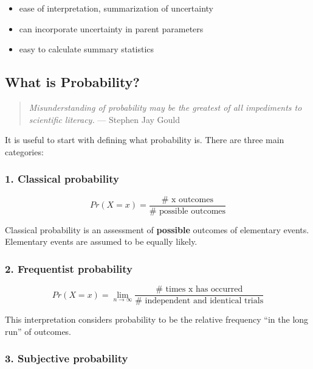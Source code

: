 \documentclass[11pt]{article}
\providecommand{\tightlist}{%
      \setlength{\itemsep}{0pt}\setlength{\parskip}{0pt}}
\begin{document}
\begin{itemize}
\tightlist
\item
  ease of interpretation, summarization of uncertainty
\item
  can incorporate uncertainty in parent parameters
\item
  easy to calculate summary statistics
\end{itemize}

    \hypertarget{what-is-probability}{%
\subsection{What is Probability?}\label{what-is-probability}}

\begin{quote}
\emph{Misunderstanding of probability may be the greatest of all
impediments to scientific literacy.} --- Stephen Jay Gould
\end{quote}

It is useful to start with defining what probability is. There are three
main categories:

\hypertarget{classical-probability}{%
\subsubsection{1. Classical probability}\label{classical-probability}}

\[Pr(X=x) = \frac{\text{# x outcomes}}{\text{# possible outcomes}}\]

Classical probability is an assessment of \textbf{possible} outcomes of
elementary events. Elementary events are assumed to be equally likely.

\hypertarget{frequentist-probability}{%
\subsubsection{2. Frequentist
probability}\label{frequentist-probability}}

\[Pr(X=x) = \lim_{n \rightarrow \infty} \frac{\text{# times x has occurred}}{\text{# independent and identical trials}}\]

This interpretation considers probability to be the relative frequency
``in the long run'' of outcomes.

\hypertarget{subjective-probability}{%
\subsubsection{3. Subjective probability}\label{subjective-probability}}
\end{document}
